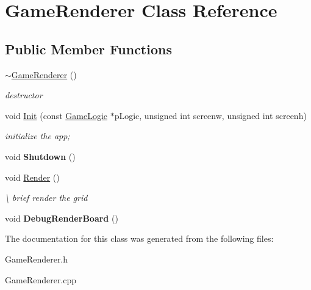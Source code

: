 \hypertarget{class_game_renderer}{\section{Game\-Renderer Class Reference}
\label{class_game_renderer}
}
\subsection*{Public Member Functions}
\begin{DoxyCompactItemize}
\item 
\hypertarget{class_game_renderer_a7548becdb4364d14cafa7a5436f42af6}{\hyperlink{class_game_renderer_a7548becdb4364d14cafa7a5436f42af6}{$\sim$\-Game\-Renderer} ()}\label{class_game_renderer_a7548becdb4364d14cafa7a5436f42af6}

\begin{DoxyCompactList}\small\item\em destructor \end{DoxyCompactList}\item 
\hypertarget{class_game_renderer_a7591573f566d6da2ba8f175ac42e61ee}{void \hyperlink{class_game_renderer_a7591573f566d6da2ba8f175ac42e61ee}{Init} (const \hyperlink{class_game_logic}{Game\-Logic} $\ast$p\-Logic, unsigned int screenw, unsigned int screenh)}\label{class_game_renderer_a7591573f566d6da2ba8f175ac42e61ee}

\begin{DoxyCompactList}\small\item\em initialize the app; \end{DoxyCompactList}\item 
\hypertarget{class_game_renderer_a2f8243204abbf389f3822e37feb8019b}{void {\bfseries Shutdown} ()}\label{class_game_renderer_a2f8243204abbf389f3822e37feb8019b}

\item 
\hypertarget{class_game_renderer_aef383939911f229fa80a04d60c00ea85}{void \hyperlink{class_game_renderer_aef383939911f229fa80a04d60c00ea85}{Render} ()}\label{class_game_renderer_aef383939911f229fa80a04d60c00ea85}

\begin{DoxyCompactList}\small\item\em \textbackslash{} brief render the grid \end{DoxyCompactList}\item 
\hypertarget{class_game_renderer_adfbc707ab6309c4e3af60a1b4fb0d9d2}{void {\bfseries Debug\-Render\-Board} ()}\label{class_game_renderer_adfbc707ab6309c4e3af60a1b4fb0d9d2}

\end{DoxyCompactItemize}


The documentation for this class was generated from the following files\-:\begin{DoxyCompactItemize}
\item 
Game\-Renderer.\-h\item 
Game\-Renderer.\-cpp\end{DoxyCompactItemize}
